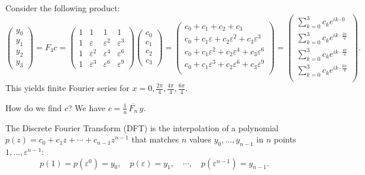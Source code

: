 Consider the following product:
$$
\begin{pmatrix}
y_0 \\
y_1 \\
y_2 \\
y_3
\end{pmatrix}
= F_4 c =
\begin{pmatrix}
1 & 1 & 1 & 1 \\
1 & \varepsilon & \varepsilon^2 & \varepsilon^3 \\
1 & \varepsilon^2 & \varepsilon^4 & \varepsilon^6 \\
1 & \varepsilon^3 & \varepsilon^6 & \varepsilon^9
\end{pmatrix}
\begin{pmatrix}
c_0 \\
c_1 \\
c_2 \\
c_3
\end{pmatrix}
=
\begin{pmatrix}
c_0 + c_1 + c_2 + c_3 \\
c_0 + c_1 \varepsilon + c_2 \varepsilon^2 + c_3 \varepsilon^3 \\
c_0 + c_1 \varepsilon^2 + c_2 \varepsilon^4 + c_3 \varepsilon^6 \\
c_0 + c_1 \varepsilon^3 + c_2 \varepsilon^6 + c_3 \varepsilon^9 \\
\end{pmatrix} = 
\begin{pmatrix}
\sum_{k=0}^{3} c_k e^{ik\cdot 0} \\
\sum_{k=0}^{3} c_k e^{ik\cdot \frac{2\pi}{4}} \\
\sum_{k=0}^{3} c_k e^{ik\cdot \frac{4\pi}{4}} \\
\sum_{k=0}^{3} c_k e^{ik\cdot \frac{6\pi}{4}} \\
    \end{pmatrix}.
$$
This yields finite Fourier series for $x = 0, \frac{2\pi}{4}, \frac{4\pi}{4}, \frac{6\pi}{4}$.

How do we find $c$? We have $c = \frac{1}{n} \, \overline{F_n} \, y$.

\begin{definition}
The Discrete Fourier Transform (DFT) is the interpolation of a polynomial $p(z)=c_0+c_1 z+\cdots+ c_{n-1} z^{n-1}$ that matches $n$ values $y_0, \ldots, y_{n-1}$ in $n$ points $1, \ldots, \varepsilon^{n-1}$:
$$
p(1) = p(\varepsilon^0) = y_0, \quad p(\varepsilon) = y_1, \quad \cdots, \quad p(\varepsilon^{n-1}) = y_{n-1}.
$$
\end{definition}

